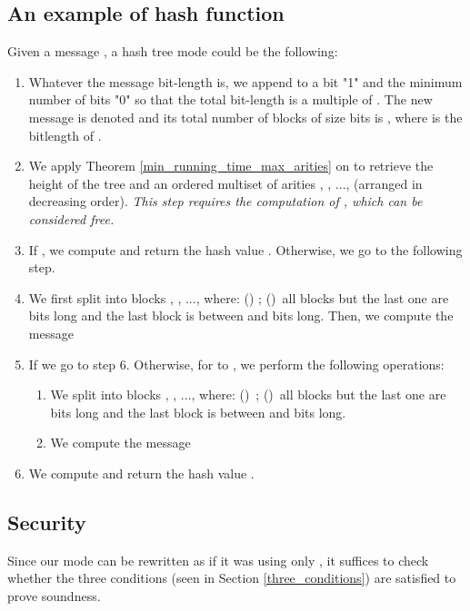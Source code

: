 \documentclass{llncs}
\begin{document}
\subsection{An example of hash function}
Given a message , a hash tree mode could be the following:
\begin{enumerate}
 \item Whatever the message bit-length is, we append to  a bit "1" and the minimum number of bits "0" so that the total bit-length is a multiple
 of . The new message is denoted  and its total number of blocks of size  bits is , where
  is the bitlength of . 
\item We apply Theorem \ref{min_running_time_max_arities} on  to retrieve the height 
  of the tree and an ordered multiset  of arities , , ...,  (arranged in decreasing order).
 \emph{This step requires the computation of , which can be considered free.}
 \item If , we compute and return the hash value . Otherwise, we go to the following step.
 \item We first split  into blocks , , ...,  where: () ; ()~all blocks but the last one are
 bits long and the last block is between  and  bits long.
 Then, we compute the message
 
 \item If  we go to step 6. Otherwise, for  to , we perform the following operations:
 \begin{enumerate}
  \item We split  into blocks , , ...,  where: ()~; 
  ()~all blocks but the last one are  bits long and the last block is between  and  bits long.
  \item We compute the message 
  
 \end{enumerate}
  \item We compute and return the hash value .


\end{enumerate}

\subsection{Security}\label{sec_section}



Since our mode can be rewritten as if it was using only ,
it suffices to check whether the three conditions (seen in Section \ref{three_conditions}) are satisfied to prove soundness.~\\
\end{document}
